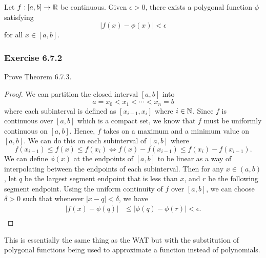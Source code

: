 \begin{theorem}
    Let \( f: [a,b] \to \mathbb{R}  \) be continuous. Given \( \epsilon > 0   \), there exists a polygonal function \( \phi  \) satisfying 
    \[  | f(x) - \phi(x) | < \epsilon \] for all \( x \in [a,b] \).
\end{theorem}

\subsubsection{Exercise 6.7.2} Prove Theorem 6.7.3.
\begin{proof}
    We can partition the closed interval \( [a,b]  \) into 
    \[  a = x_{0} < x_{1} < \dotsb < x_{n} = b  \] where each subinterval is defined as \( [x_{i-1}, x_{i}] \) where \( i \in \mathbb{N}  \). Since \( f  \) is continuous over \( [a,b]  \) which is a compact set, we know that \( f  \) must be uniformly continuous on \( [a,b] \). Hence, \( f  \) takes on a maximum and a minimum value on \( [a,b] \). We can do this on each subinterval of \( [a,b]  \) where 
    \[  f(x_{i-1}) \leq f(x) \leq f(x_{i}) \iff f(x) - f(x_{i-1}) \leq f(x_{i}) - f(x_{i-1}) .\] We can define \( \phi(x)  \) at the endpoints of \( [a,b]  \) to be linear as a way of interpolating between the endpoints of each subinterval. Then for any \( x \in (a,b)  \), let \( q  \) be the largest segment endpoint that is less  than \( x  \), and \( r  \) be the following segment endpoint. Using the uniform continuity of \( f \) over \( [a,b]  \), we can choose \( \delta > 0  \) such that whenever 
    \( | x - q  | <  \delta \), we have 
    \begin{align*}
        | f(x) - \phi(q)  | &\leq |  \phi(q) - \phi(r) | < \epsilon. \\
    \end{align*}
\end{proof}

This is essentially the same thing as the WAT but with the substitution of polygonal functions being used to approximate a function instead of polynomials.

